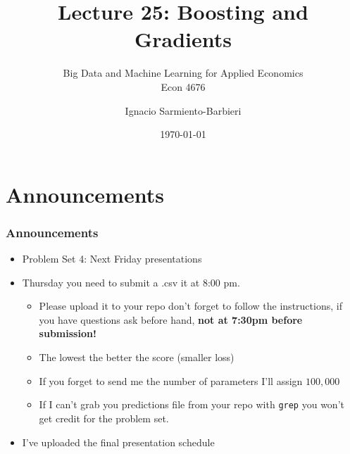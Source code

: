 \documentclass[
  shownotes,
  xcolor={svgnames},
  hyperref={colorlinks,citecolor=DarkBlue,linkcolor=DarkRed,urlcolor=DarkBlue}
  , aspectratio=169]{beamer}
\begin{document}
 
\title[Lecture 25]{Lecture 25:  Boosting and Gradients}
\subtitle{Big Data and Machine Learning for Applied Economics \\ Econ 4676}
\date{\today}

\author[Sarmiento-Barbieri]{Ignacio Sarmiento-Barbieri}


\begin{frame}[noframenumbering]
\maketitle
\end{frame}






\section{Announcements}
\begin{frame}
\frametitle{Announcements}

\begin{itemize}
\item Problem Set 4: Next Friday presentations
\medskip
\item Thursday you need to submit a .csv it at 8:00 pm. 
  \begin{itemize}
    \item Please upload it to your repo don't forget to follow the instructions, if you have questions ask before hand, {\bf not at 7:30pm before submission!} 
    \medskip
    \item The lowest the better the score (smaller loss)
    \medskip
    \item If you forget to send me the number of parameters I'll assign $100,000$
    \medskip
    \item If I can't grab you predictions file from your repo with  \texttt{grep} you won't get credit for the problem set.
  \end{itemize}
\medskip
\item I've uploaded the final presentation schedule
\end{itemize}

\end{frame}
\end{document}
